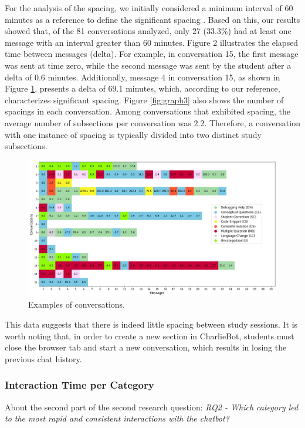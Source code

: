 \documentclass[runningheads]{llncs}
\begin{document}
For the analysis of the spacing, we initially considered a minimum interval of
60 minutes as a reference to define the significant spacing \cite{Gadella24}.
Based on this, our results showed that, of the 81 conversations analyzed, only
27 (33.3\%) had at least one message with an interval greater than 60 minutes.
Figure 2 illustrates the elapsed time between messages (delta). For example,
in conversation 15, the first message was sent at time zero, while the second
message was sent by the student after a delta of 0.6 minutes. Additionally,
message 4 in conversation 15, as shown in Figure \ref{fig:graph2}, presents a
delta of 69.1 minutes, which, according to our reference, characterizes
significant spacing. Figure \ref{fig:graph3} also shows the number of spacings
in each conversation. Among conversations that exhibited spacing, the
average number of subsections per conversation was 2.2. Therefore, a
conversation with one instance of spacing is typically divided into two distinct
study subsections.

\begin{figure}[htbp]
    \centering
    \includegraphics[scale=0.35]{img/figure2.png}
    \caption{Examples of conversations.}
    \label{fig:graph2}
\end{figure}

This data suggests that there is indeed little spacing between study sessions.
It is worth noting that, in order to create a new section in CharlieBot,
students must close the browser tab and start a new conversation, which results
in losing the previous chat history.

\subsubsection{Interaction Time per Category}

About the second part of the second research question: \textit{RQ2 - Which
category led to the most rapid and consistent interactions with the chatbot?}
\end{document}

